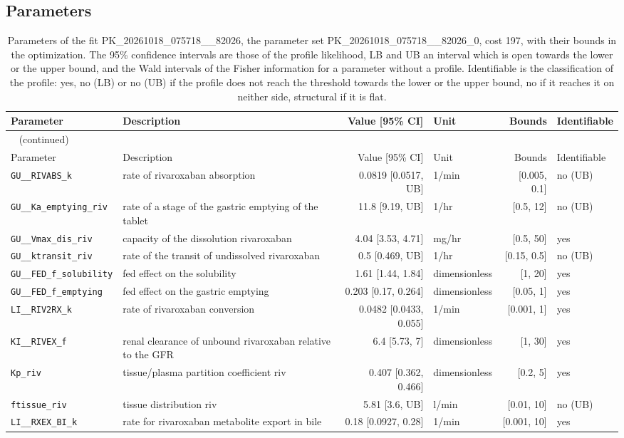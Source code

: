 \documentclass{article}
\begin{document}
\subsection{Parameters}

\begin{longtable}{llrlrl}
\caption{Parameters of the fit PK\_20261018\_075718\_\_82026, the parameter set PK\_20261018\_075718\_\_82026\_0, cost 197, with their bounds in the optimization. The 95\% confidence intervals are those of the profile likelihood, LB and UB an interval which is open towards the lower or the upper bound, and the Wald intervals of the Fisher information for a parameter without a profile. Identifiable is the classification of the profile: yes, no (LB) or no (UB) if the profile does not reach the threshold towards the lower or the upper bound, no if it reaches it on neither side, structural if it is flat.}\label{tab:parameters:PK_20261018_075718__82026} \\
\toprule
Parameter & Description & Value [95\% CI] & Unit & Bounds & Identifiable \\
\midrule
\endfirsthead
\multicolumn{6}{l}{\small\tablename~\thetable{} (continued)} \\
\toprule
Parameter & Description & Value [95\% CI] & Unit & Bounds & Identifiable \\
\midrule
\endhead
\bottomrule
\endlastfoot
\texttt{GU\_\_RIVABS\_k} & rate of rivaroxaban absorption & 0.0819 [0.0517, UB] & 1/min & [0.005, 0.1] & no (UB) \\
\texttt{GU\_\_Ka\_emptying\_riv} & rate of a stage of the gastric emptying of the tablet & 11.8 [9.19, UB] & 1/hr & [0.5, 12] & no (UB) \\
\texttt{GU\_\_Vmax\_dis\_riv} & capacity of the dissolution rivaroxaban & 4.04 [3.53, 4.71] & mg/hr & [0.5, 50] & yes \\
\texttt{GU\_\_ktransit\_riv} & rate of the transit of undissolved rivaroxaban & 0.5 [0.469, UB] & 1/hr & [0.15, 0.5] & no (UB) \\
\texttt{GU\_\_FED\_f\_solubility} & fed effect on the solubility & 1.61 [1.44, 1.84] & dimensionless & [1, 20] & yes \\
\texttt{GU\_\_FED\_f\_emptying} & fed effect on the gastric emptying & 0.203 [0.17, 0.264] & dimensionless & [0.05, 1] & yes \\
\texttt{LI\_\_RIV2RX\_k} & rate of rivaroxaban conversion & 0.0482 [0.0433, 0.055] & 1/min & [0.001, 1] & yes \\
\texttt{KI\_\_RIVEX\_f} & renal clearance of unbound rivaroxaban relative to the GFR & 6.4 [5.73, 7] & dimensionless & [1, 30] & yes \\
\texttt{Kp\_riv} & tissue/plasma partition coefficient riv & 0.407 [0.362, 0.466] & dimensionless & [0.2, 5] & yes \\
\texttt{ftissue\_riv} & tissue distribution riv & 5.81 [3.6, UB] & l/min & [0.01, 10] & no (UB) \\
\texttt{LI\_\_RXEX\_BI\_k} & rate for rivaroxaban metabolite export in bile & 0.18 [0.0927, 0.28] & 1/min & [0.001, 10] & yes \\
\end{longtable}
\end{document}
